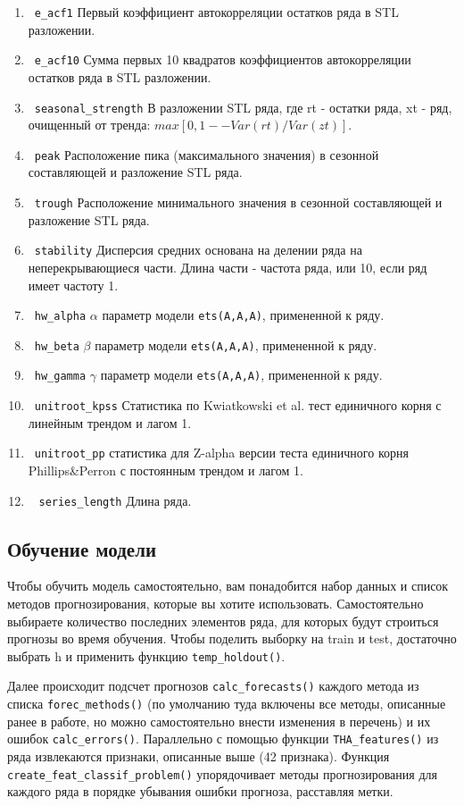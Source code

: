 \documentclass[a4paper,12pt]{article}
\theoremstyle{plain} %
\theoremstyle{definition} %
\theoremstyle{remark} %
\begin{document}
\begin{enumerate}
      \item \verb|e_acf1|  Первый коэффициент автокорреляции остатков ряда в STL разложении.
      \item \verb|e_acf10|  Сумма первых 10 квадратов коэффициентов автокорреляции остатков ряда в STL разложении.
      \item \verb|seasonal_strength|  В разложении STL ряда, где rt - остатки ряда, xt - ряд, очищенный от тренда: $max[0,1 -- Var(rt)/Var(zt)]$.
      \item \verb|peak|  Расположение пика (максимального значения) в сезонной составляющей и разложение STL ряда.
      \item \verb|trough|  Расположение минимального значения в сезонной составляющей и разложение STL ряда.
      \item \verb|stability|  Дисперсия средних основана на делении ряда на неперекрывающиеся части. Длина части -  частота ряда, или 10, если ряд имеет частоту 1.
      \item \verb|hw_alpha|  $\alpha$ параметр модели \verb|ets(A,A,A)|, примененной к ряду.
      \item \verb|hw_beta| $\beta$ параметр модели \verb|ets(A,A,A)|, примененной к ряду.
      \item \verb|hw_gamma| $\gamma$ параметр модели \verb|ets(A,A,A)|, примененной к ряду.
      \item \verb|unitroot_kpss| Статистика по Kwiatkowski et al. тест единичного корня с линейным трендом и лагом 1.
      \item \verb|unitroot_pp| статистика для  Z-alpha версии теста единичного корня Phillips\&Perron с постоянным трендом и лагом 1.
      \item  \verb|series_length| Длина ряда.
    \end{enumerate}

\subsection{Обучение модели}

  Чтобы обучить модель самостоятельно, вам понадобится набор данных и список методов прогнозирования, которые вы хотите использовать.
  Самостоятельно выбираете количество последних элементов ряда, для которых будут строиться прогнозы во время обучения.
  Чтобы поделить выборку на train и test, достаточно выбрать h и применить функцию \verb|temp_holdout()|.

  Далее происходит подсчет прогнозов \verb|calc_forecasts()| каждого метода из списка \verb|forec_methods()| (по умолчанию туда включены все методы, описанные ранее в работе, но можно самостоятельно внести изменения в перечень) и их ошибок \verb|calc_errors()|.
  Параллельно с помощью функции \verb|THA_features()| из ряда извлекаются признаки, описанные выше (42 признака).
  Функция \verb|create_feat_classif_problem()| упорядочивает методы прогнозирования для каждого ряда в порядке убывания ошибки прогноза, расставляя метки.
\end{document}
